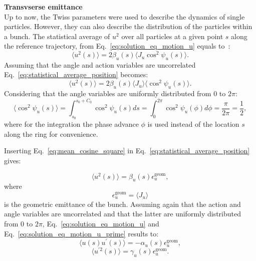  \textbf{Transvserse emittance}\\
Up to now, the Twiss parameters were used to describe the dynamics of single particles. However, they can also describe the distribution of the particles within a bunch. The statistical average of $u^2$ over all particles at a given point $s$ along the reference trajectory, from Eq.~\eqref{eq:solution_eq_motion_u} equals to~\cite{wolski2014}:
 \begin{equation}\label{eq:statistical_average_position}
     \langle u^2(s) \rangle = 2 \beta_u(s) \langle J_u \cos^2{\psi_u(s)} \rangle.
 \end{equation}
 Assuming that the angle and action variables are uncorrelated Eq.~\eqref{eq:statistical_average_position} becomes:
 \begin{equation}\label{eq:statistical_average_position_2}
     \langle u^2(s) \rangle = 2 \beta_u(s) \langle J_u \rangle \langle \cos^2{\psi_u(s)} \rangle.
 \end{equation}
 Considering that the angle variables are uniformly distributed from 0 to $2\pi$: %
 \begin{equation}\label{eq:mean_cosine_square}
     \langle \cos^2{\psi_u(s)} \rangle = \int_{s_0}^{s_0+C_0} \cos^2{\psi_u(s)} ds =   \int_0^{2\pi} \cos^2{\psi_u(\phi)} d\phi = \frac{\pi}{2\pi} = \frac{1}{2},
 \end{equation}
 where for the integration the phase advance $\phi$ is used instead of the location $s$ along the ring for convenience. %
 
 Inserting Eq.~\eqref{eq:mean_cosine_square} in Eq.~\eqref{eq:statistical_average_position} gives:
 
 \begin{equation}\label{eq:emittance_definition_1} %
     \langle u^2(s) \rangle = \beta_u(s)  \epsilon^{\mathrm{geom}}_u,
 \end{equation}
 where
 \begin{equation}\label{eq:geom_emittance_action}
     \epsilon^{\mathrm{geom}}_u=\langle J_u \rangle
 \end{equation}
 is the geometric emittance of the bunch. Assuming again that the action and angle variables are uncorrelated and that the latter are uniformly distributed from 0 to $2\pi$, Eq.~\eqref{eq:solution_eq_motion_u} and Eq.~\eqref{eq:solution_eq_motion_u_prime} results to:
 \begin{equation}\label{eq:u_uprime_eq_1}
     \langle u(s) u^\prime(s) \rangle = - \alpha_u(s) \epsilon^{\mathrm{geom}}_u,
 \end{equation}
 \begin{equation}\label{eq:u_uprime_eq_2}
     \langle u^{\prime 2}(s) \rangle = \gamma_u(s) \epsilon^{\mathrm{geom}}_u.
 \end{equation}
 
